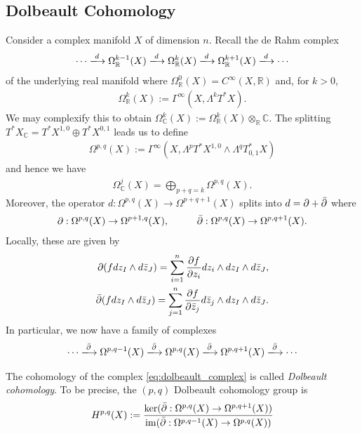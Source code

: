 \documentclass[12pt]{ociamthesis}  %
\begin{document}
\subsection{Dolbeault Cohomology}
\missingcitation

Consider a complex manifold $X$ of dimension $n$. Recall the de Rahm
complex
\begin{align*}
  \cdots \xlongrightarrow{d}
  \Omega_{\mathbb{R}}^{k-1}(X)\xlongrightarrow{d}
  \Omega_{\mathbb{R}}^{k}(X)\xlongrightarrow{d}
  \Omega_{\mathbb{R}}^{k+1}(X)\xlongrightarrow{d}
  \cdots
\end{align*}
of the underlying real manifold where
$\Omega^0_{\mathbb{R}}(X) = C^\infty(X,\mathbb{R})$ and,
for $k > 0$,
\begin{align*}
  \Omega^k_{\mathbb{R}}(X) := \Gamma^\infty(X,\Lambda^k T^*X).
\end{align*}
We may complexify this to obtain
$\Omega^k_{\mathbb C}(X) := \Omega^k_{\mathbb R}(X)\otimes_{\mathbb{R}} \mathbb{C}$.
The splitting $T^*X_\mathbb{C} = T^*X^{1,0} \oplus T^*X^{0,1}$
leads us to define
\begin{align*}
  \Omega^{p,q}(X)
  := \Gamma^\infty(X,\Lambda^p T^*X^{1,0} \wedge\Lambda^q T^*_{0,1}X)
\end{align*}
and hence we have
\begin{align*}
  \Omega^j_{\mathbb C}(X) = \bigoplus_{p+q=k} \Omega^{p,q}(X).
\end{align*}
Moreover, the operator $d : \Omega^{p,q}(X) \to \Omega^{p+q+1}(X)$
splits into $d = \partial + {\bar{\partial}}$ where
\begin{align*}
  \partial : \Omega^{p,q}(X) \to \Omega^{p+1,q}(X),\hspace{1cm}
  {\bar{\partial}} : \Omega^{p,q}(X) \to \Omega^{p,q+1}(X).
\end{align*}
Locally, these are given by
\begin{align*}
  \partial (f dz_I \wedge d\bar z_J) = \sum_{i=1}^n \frac{\partial f}{\partial z_i} dz_i\wedge dz_I \wedge d\bar z_J, \\
  {\bar{\partial}} (f dz_I \wedge d\bar z_J) = \sum_{j=1}^n \frac{\partial f}{\partial \bar z_j} d\bar z_j\wedge dz_I \wedge d\bar z_J.
\end{align*}
In particular, we now have a family of complexes
\begin{align}\label{eq:dolbeault_complex}
  \cdots \xlongrightarrow\dol
  \Omega^{p,q-1}(X)\xlongrightarrow\dol
  \Omega^{p,q}(X)\xlongrightarrow\dol
  \Omega^{p,q+1}(X)\xlongrightarrow\dol
  \cdots
\end{align}
\begin{definition}
  The cohomology of the complex \ref{eq:dolbeault_complex} is
  called \emph{Dolbeault cohomology}. To be precise, the
  $(p,q)$ Dolbeault cohomology group is
  \begin{align*}
    H^{p,q}(X) := \frac{
      \ker({\bar{\partial}} : \Omega^{p,q}(X) \to \Omega^{p,q+1}(X))
    }{
      \operatorname{im}({\bar{\partial}} : \Omega^{p,q-1}(X) \to \Omega^{p,q}(X))
    }
  \end{align*}
\end{definition}
\end{document}
